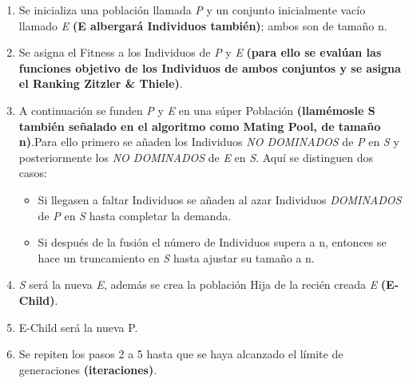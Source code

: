 \documentclass[class=report, crop=false]{standalone}
\begin{document}
\begin{enumerate}
\item Se inicializa una población llamada \emph{P} y un conjunto inicialmente vacío llamado \emph{E} \textbf{(E albergará Individuos también)}; ambos son de tamaño n.
\item Se asigna el Fitness a los Individuos de \emph{P} y \emph{E} \textbf{(para ello se evalúan las funciones objetivo de los Individuos de ambos conjuntos y se asigna el Ranking Zitzler \& Thiele)}.
\item A continuación se funden \emph{P} y \emph{E} en una súper Población \textbf{(llamémosle S también señalado en el algoritmo como Mating Pool, de tamaño n)}.Para ello primero se añaden los Individuos \emph{NO DOMINADOS} de \emph{P} en \emph{S} y posteriormente los \emph{NO DOMINADOS} de \emph{E} en \emph{S}.\break 
Aquí se distinguen dos casos:
      \begin{itemize}
      \item Si llegasen a faltar Individuos se añaden al azar Individuos \emph{DOMINADOS} de \emph{P} en \emph{S} hasta completar la demanda.
      \item Si después de la fusión el número de Individuos supera a n, entonces se hace un truncamiento en \emph{S} hasta ajustar su tamaño a n.
      \end{itemize}
\item \emph{S} será la nueva \emph{E}, además se crea la población Hija de la recién creada \emph{E} \textbf{(E-Child)}.
\item E-Child será la nueva P.
\item Se repiten los pasos 2 a 5 hasta que se haya alcanzado el límite de generaciones \textbf{(iteraciones)}.
\end{enumerate}
\end{document}
